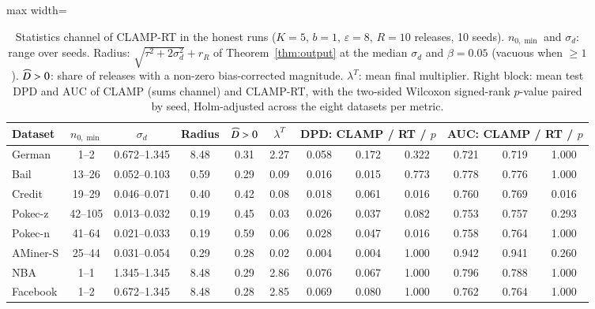 \begin{table}[tbp]
\centering
\scriptsize
\setlength{\tabcolsep}{3pt}
\caption{Statistics channel of CLAMP-RT in the honest runs ($K=5$, $b=1$, $\varepsilon=8$, $R=10$ releases, 10 seeds). $n_{0,\min}$ and $\sigma_d$: range over seeds. Radius: $\sqrt{\tau^2+2\sigma_d^2}+r_R$ of Theorem~\ref{thm:output} at the median $\sigma_d$ and $\beta=0.05$ (vacuous when $\ge1$). $\widehat{D}>0$: share of releases with a non-zero bias-corrected magnitude. $\lambda^T$: mean final multiplier. Right block: mean test DPD and AUC of CLAMP (sums channel) and CLAMP-RT, with the two-sided Wilcoxon signed-rank $p$-value paired by seed, Holm-adjusted across the eight datasets per metric.}
\label{tab:channel}
\begin{adjustbox}{max width=\textwidth}
\begin{tabular}{lccccc|ccc|ccc}
\toprule
Dataset & $n_{0,\min}$ & $\sigma_d$ & Radius & $\widehat{D}>0$ & $\lambda^T$ & \multicolumn{3}{c|}{DPD: CLAMP / RT / $p$} & \multicolumn{3}{c}{AUC: CLAMP / RT / $p$} \\
\midrule
German & 1--2 & 0.672--1.345 & 8.48 & 0.31 & 2.27 & 0.058 & 0.172 & 0.322 & 0.721 & 0.719 & 1.000 \\
Bail & 13--26 & 0.052--0.103 & 0.59 & 0.29 & 0.09 & 0.016 & 0.015 & 0.773 & 0.778 & 0.776 & 1.000 \\
Credit & 19--29 & 0.046--0.071 & 0.40 & 0.42 & 0.08 & 0.018 & 0.061 & 0.016 & 0.760 & 0.769 & 0.016 \\
Pokec-z & 42--105 & 0.013--0.032 & 0.19 & 0.45 & 0.03 & 0.026 & 0.037 & 0.082 & 0.753 & 0.757 & 0.293 \\
Pokec-n & 41--64 & 0.021--0.033 & 0.19 & 0.59 & 0.06 & 0.028 & 0.047 & 0.016 & 0.758 & 0.764 & 1.000 \\
AMiner-S & 25--44 & 0.031--0.054 & 0.29 & 0.28 & 0.02 & 0.004 & 0.004 & 1.000 & 0.942 & 0.941 & 0.260 \\
NBA & 1--1 & 1.345--1.345 & 8.48 & 0.29 & 2.86 & 0.076 & 0.067 & 1.000 & 0.796 & 0.788 & 1.000 \\
Facebook & 1--2 & 0.672--1.345 & 8.48 & 0.28 & 2.85 & 0.069 & 0.080 & 1.000 & 0.762 & 0.764 & 1.000 \\
\bottomrule
\end{tabular}
\end{adjustbox}
\end{table}
